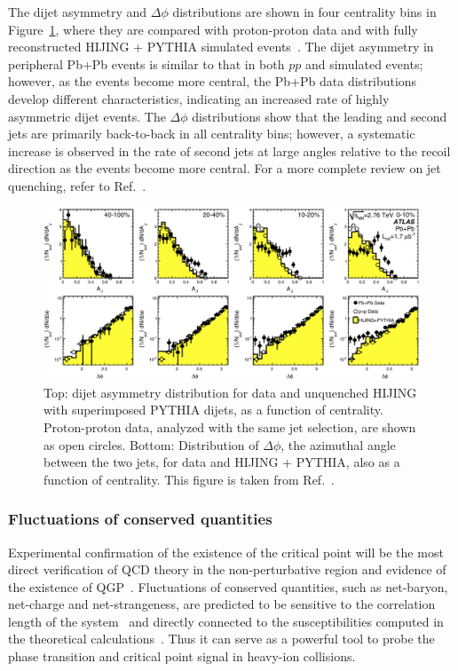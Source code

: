 The dijet asymmetry and $\Delta\phi$ distributions are shown in four centrality bins in Figure~\ref{fig:intro_jet_asym_ATLAS}, where they are compared with proton-proton data and with fully reconstructed HIJING + PYTHIA simulated events~\cite{Aad:2010bu}. The dijet asymmetry in peripheral Pb+Pb events is similar to that in both $pp$ and simulated events; however, as the events become more central, the Pb+Pb data distributions develop different characteristics, indicating an increased rate of highly asymmetric dijet events. The $\Delta\phi$ distributions show that the leading and second jets are primarily back-to-back in all centrality bins; however, a systematic increase is observed in the rate of second jets at large angles relative to the recoil direction as the events become more central. For a more complete review on jet quenching, refer to Ref.~\cite{dEnterria:2009xfs}.
\begin{figure}[H]
\centering
\includegraphics[width=.95\linewidth]{figs/chapter_intro/jet_asym_ATLAS.png}
\caption{Top: dijet asymmetry distribution for data and unquenched HIJING with superimposed PYTHIA dijets, as a function of centrality. Proton-proton data, analyzed with the same jet selection, are shown as open circles. Bottom: Distribution of $\Delta\phi$, the azimuthal angle between the two jets, for data and HIJING + PYTHIA, also as a function of centrality. This figure is taken from Ref.~\cite{Aad:2010bu}.}
\label{fig:intro_jet_asym_ATLAS}
\end{figure}



\subsubsection{Fluctuations of conserved quantities}

Experimental confirmation of the existence of the critical point will be the most direct verification of QCD theory in the non-perturbative region and evidence of the existence of QGP~\cite{Luo:2015cea}. Fluctuations of conserved quantities, such as net-baryon, net-charge and net-strangeness, are predicted to be sensitive to the correlation length of the system~\cite{Stephanov:2008qz} and directly connected to the susceptibilities computed in the theoretical calculations~\cite{Gupta:2011wh}. Thus it can serve as a powerful tool to probe the phase transition and critical point signal in heavy-ion collisions.

